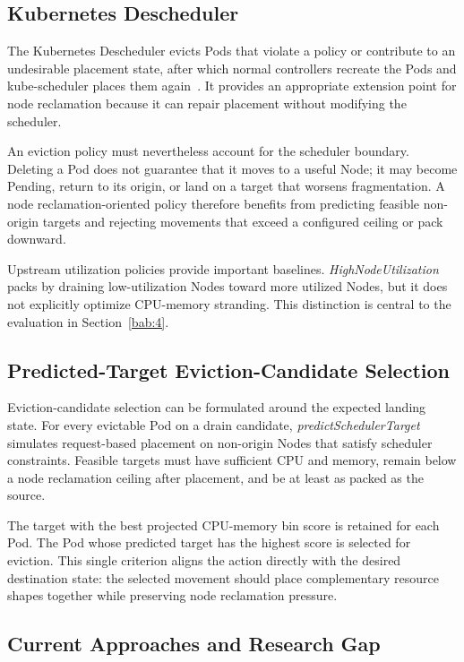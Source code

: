 \subsection{Kubernetes Descheduler}
\label{sec:deschedulerLimitations}

The Kubernetes Descheduler evicts Pods that violate a policy or contribute to an undesirable placement state, after which normal controllers recreate the Pods and kube-scheduler places them again~\cite{k8s_descheduler_docs}. It provides an appropriate extension point for node reclamation because it can repair placement without modifying the scheduler.

An eviction policy must nevertheless account for the scheduler boundary. Deleting a Pod does not guarantee that it moves to a useful Node; it may become Pending, return to its origin, or land on a target that worsens fragmentation. A node reclamation-oriented policy therefore benefits from predicting feasible non-origin targets and rejecting movements that exceed a configured ceiling or pack downward.

Upstream utilization policies provide important baselines. \textit{HighNodeUtilization} packs by draining low-utilization Nodes toward more utilized Nodes, but it does not explicitly optimize CPU-memory stranding. This distinction is central to the evaluation in Section~\ref{bab:4}.

\subsection{Predicted-Target Eviction-Candidate Selection}
\label{sec:predictedTargetSelection}

Eviction-candidate selection can be formulated around the expected landing state. For every evictable Pod on a drain candidate, \textit{predictSchedulerTarget} simulates request-based placement on non-origin Nodes that satisfy scheduler constraints. Feasible targets must have sufficient CPU and memory, remain below a node reclamation ceiling after placement, and be at least as packed as the source.

The target with the best projected CPU-memory bin score is retained for each Pod. The Pod whose predicted target has the highest score is selected for eviction. This single criterion aligns the action directly with the desired destination state: the selected movement should place complementary resource shapes together while preserving node reclamation pressure.

\subsection{Current Approaches and Research Gap}
\label{sec:researchGap}

